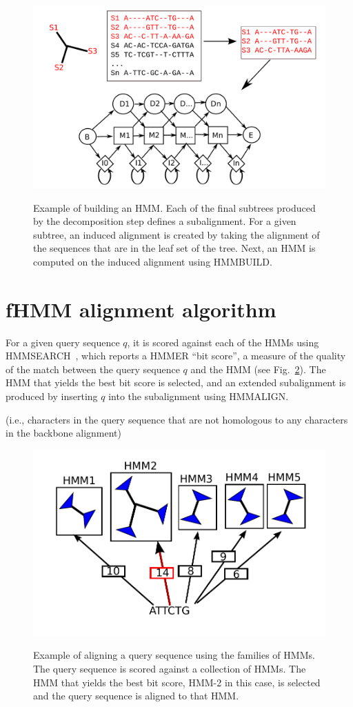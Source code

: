 \begin{figure}[htbp]
\centering
{\includegraphics[width=.750\textwidth]{hmmfamily/build_hmm}}
\caption[Building an HMM.]{Example of building an HMM.  Each of the final subtrees produced by the decomposition step defines a subalignment.  For a given subtree, an induced alignment is created by taking the alignment of the sequences that are in the leaf set of the tree.  Next, an HMM is computed on the induced alignment using HMMBUILD.} 
\label{hmmfamily:hmmbuild}
\end{figure}

\section{fHMM alignment algorithm}\label{hmmfamily:alignment}
For a given query sequence $q$, it is scored against each of the HMMs using HMMSEARCH~\cite{hmmer}, which reports a HMMER ``bit score'', a measure of the quality of the match between the query sequence $q$ and the HMM (see Fig.~\ref{hmmfamily:align}).  The HMM that yields the best bit score is selected, and an extended subalignment is produced by inserting $q$ into the subalignment using HMMALIGN.  

(i.e., characters in the query sequence that are not homologous to any characters in the backbone alignment) 

\begin{figure}[htbp]
\centering
{\includegraphics[width=1.0\textwidth]{hmmfamily/search_2.pdf}}
\caption[Example of alignment using HMM families.]{Example of aligning a query sequence using the families of HMMs.  The query sequence is scored against a collection of HMMs.  The HMM that yields the best bit score, HMM-2 in this case, is selected and the query sequence is aligned to that HMM.} 
\label{hmmfamily:align}
\end{figure}

